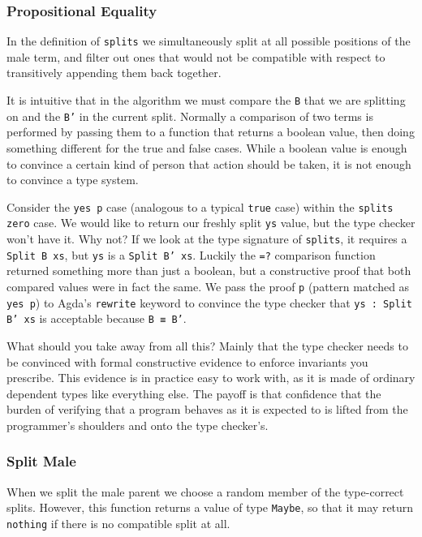 \documentclass{acm_proc_article-sp}
\begin{document}
\subsubsection{Propositional Equality}

In the definition of \texttt{splits} we simultaneously split at all
possible positions of the male term, and filter out ones that would
not be compatible with respect to transitively appending them back
together.

It is intuitive that in the algorithm we must compare the \texttt{B}
that we are splitting on and the \texttt{B'} in the current
split. Normally a comparison of two terms is performed by passing them
to a function that returns a boolean value, then doing something
different for the true and false cases. While a boolean value is
enough to convince a certain kind of person that action should be
taken, it is not enough to convince a type system.

Consider the \texttt{yes p} case (analogous to a typical \texttt{true}
case) within the \texttt{splits zero} case. We would like to return
our freshly split \texttt{ys} value, but the type checker won't have
it. Why not? If we look at the type signature of \texttt{splits}, it
requires a \texttt{Split B xs}, but \texttt{ys} is a \texttt{Split B'
  xs}. Luckily the \texttt{=?} comparison function returned something
more than just a boolean, but a constructive proof that both compared
values were in fact the same. We pass the proof \texttt{p} (pattern
matched as \texttt{yes p}) to Agda's \texttt{rewrite} keyword to
convince the type checker that \texttt{ys : Split B' xs} is acceptable
because \texttt{B ≡ B'}.

What should you take away from all this? Mainly that the type checker
needs to be convinced with formal constructive evidence to enforce
invariants you prescribe. This evidence is in practice easy to work
with, as it is made of ordinary dependent types like everything
else. The payoff is that confidence that the burden of verifying that
a program behaves as it is expected to is lifted from the programmer's
shoulders and onto the type checker's.

\subsubsection{Split Male}

When we split the male parent we choose a random member of the
type-correct splits. However, this function returns a value of type
\texttt{Maybe}, so that it may return \texttt{nothing} if there is no
compatible split at all.
\end{document}
